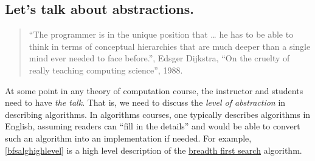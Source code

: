 \hypertarget{eatandhavecake}{}

\subsection{Let's talk about
abstractions.}\label{Lets-talk-about-abstracti}

\begin{quote}
``The programmer is in the unique position that \ldots{} he has to be
able to think in terms of conceptual hierarchies that are much deeper
than a single mind ever needed to face before.'', Edsger Dijkstra, ``On
the cruelty of really teaching computing science'', 1988.
\end{quote}

At some point in any theory of computation course, the instructor and
students need to have \emph{the talk}. That is, we need to discuss the
\emph{level of abstraction} in describing algorithms. In algorithms
courses, one typically describes algorithms in English, assuming readers
can ``fill in the details'' and would be able to convert such an
algorithm into an implementation if needed. For example,
\cref{bfsalghighlevel} is a high level description of the
\href{https://goo.gl/ug7Jaj}{breadth first search} algorithm.



